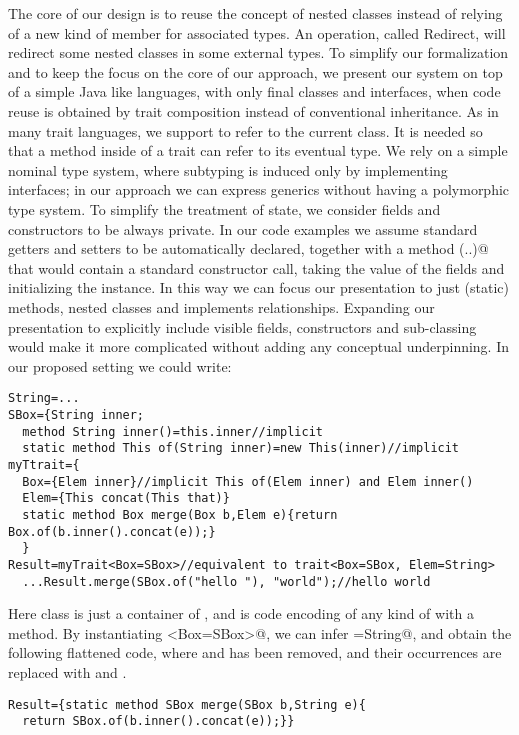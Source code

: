 The core of our design is to reuse the concept of nested classes instead of relying of a new kind of member for
associated types.
An operation, called Redirect, will redirect some nested classes in some external types.
To simplify our formalization and to keep the focus on the core of our approach, we 
present our system on top of a simple 
Java like languages, with only final classes and interfaces, when code reuse is obtained by
trait composition instead of conventional inheritance.
As in many trait languages, we support \Q@This@ to refer to the current
class. It is needed so that a method inside of a trait can refer to its eventual type.
We rely on a simple nominal type system, where subtyping is induced only by implementing interfaces;
in our approach we can express generics without having a polymorphic type system.
To simplify the treatment of state, we consider fields and constructors to be always private.
In our code examples we assume standard getters and setters to be automatically declared, together with a \Q@static@ method \Q@of(..)@
that would contain a standard constructor call, taking the value of the fields and initializing the instance.
In this way we can focus our presentation to just (static) methods, nested classes and implements relationships.
Expanding our presentation to explicitly include visible fields, constructors and sub-classing would
make it more complicated without adding any conceptual underpinning.
In our proposed setting we could write:
\begin{lstlisting}
String=...
SBox={String inner;
  method String inner()=this.inner//implicit
  static method This of(String inner)=new This(inner)//implicit
myTtrait={
  Box={Elem inner}//implicit This of(Elem inner) and Elem inner()
  Elem={This concat(This that)}
  static method Box merge(Box b,Elem e){return Box.of(b.inner().concat(e));}
  }
Result=myTrait<Box=SBox>//equivalent to trait<Box=SBox, Elem=String>
  ...Result.merge(SBox.of("hello "), "world");//hello world
\end{lstlisting}
Here class \Q@SBox@ is just a container of \Q@String@s, and \Q@myTrait@ is code
encoding \Q@Box@es of any kind of \Q@Elem@ with a \Q@concat@ method.
By instantiating \Q@myTrait<Box=SBox>@, we can infer \Q@Elem=String@, and 
obtain the following flattened code,
where \Q@Box@ and \Q@Elem@ has been removed, and their occurrences are replaced with \Q@SBox@ and \Q@String@.
\begin{lstlisting}
Result={static method SBox merge(SBox b,String e){
  return SBox.of(b.inner().concat(e));}}
\end{lstlisting}

